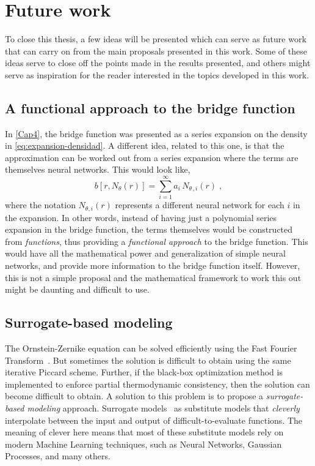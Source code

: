 \section{Future work}
To close this thesis, a few ideas will be presented which can serve as future work that can 
carry on from the main proposals presented in this work. Some of these ideas serve to close 
off the points made in the results presented, and others might serve as inspiration for the 
reader interested in the topics developed in this work.

\subsection{A functional approach to the bridge function}
In \autoref{Cap4}, the bridge function was presented as a series expansion on the density 
in \autoref{eq:expansion-densidad}. A different idea, related to this one, is that the 
approximation can be worked out from a series expansion where the terms are themselves 
neural networks. This would look like,
\begin{equation}
    b \left[r, N_{\theta}(r)\right] = \sum_{i=1}^{\infty} a_{i} \, N_{\theta \, , i} (r)
    \; ,
    \label{eq:functional-bridge}
\end{equation}
where the notation \(N_{\theta,i}(r)\) represents a different neural network for each 
\(i\) in the expansion. In other words, instead of having just a polynomial series 
expansion in the bridge function, the terms themselves would be constructed from 
\emph{functions}, thus providing a \emph{functional approach} to the bridge function. This 
would have all the mathematical power and generalization of simple neural networks, and 
provide more information to the bridge function itself. However, this is not a simple 
proposal and the mathematical framework to work this out might be daunting and difficult to 
use.

\subsection{Surrogate-based modeling}
The Ornstein-Zernike equation can be solved efficiently using the Fast Fourier 
Transform~\cite{hammingNumericalMethodsScientists2012}. But sometimes the solution is 
difficult to obtain using the same iterative Piccard scheme. Further, if the black-box 
optimization method is implemented to enforce partial thermodynamic consistency, then the 
solution can become difficult to obtain. A solution to this problem is to propose a 
\emph{surrogate-based modeling} approach. Surrogate 
models~\cite{forresterRecentAdvancesSurrogatebased2009} as substitute models that 
\emph{cleverly} interpolate between the input and output of difficult-to-evaluate 
functions. The meaning of clever here means that most of these substitute models rely on 
modern Machine Learning techniques, such as Neural Networks, Gaussian Processes, and many 
others.

